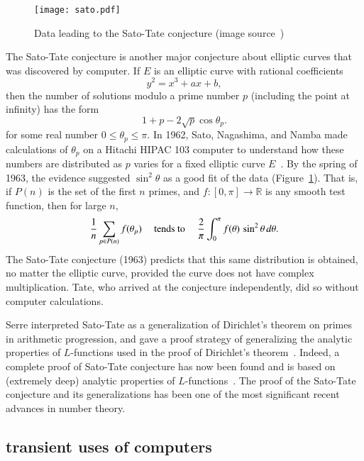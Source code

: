 \documentclass{llncs}
\newcommand{\ring}[1]{\mathbb{#1}}
\begin{document}

\begin{figure}[h!]
  \centering
\texttt{[image: sato.pdf]}
  \caption{Data leading to the Sato-Tate conjecture (image source~\cite{ST2})}
\label{fig:st}
\end{figure}



The Sato-Tate conjecture is another major conjecture about elliptic
curves that was discovered by computer.  If $E$ is an elliptic curve
with rational coefficients
\[
y^2 = x^3 + a x + b,
\]
then the number of solutions modulo a prime number $p$ (including the
point at infinity) has the form
\[
1 + p - 2\sqrt{p}\cos\theta_p.
\]
for some real number $0\le \theta_p\le \pi$.  In 1962, Sato,
Nagashima, and Namba made calculations  of $\theta_p$ on a Hitachi
HIPAC 103 computer to understand how these numbers are distributed as
$p$ varies for a fixed elliptic curve $E$~\cite{Sch}.  By the spring of 1963, the
evidence suggested  $\sin^2\theta$ as a good fit of the data (Figure~\ref{fig:st}).
That is, if $P(n)$ is the set of the first $n$ primes, and
$f:[0,\pi]\to\ring{R}$ is any smooth test function, then for large
$n$,
\[
\frac{1}{n}\sum_{p\in P(n)} f(\theta_p) \quad\hbox{ tends to }\quad
\frac{2}{\pi}\int_0^\pi f(\theta)\,\sin^2\theta\,d\theta.
\]
The Sato-Tate conjecture (1963) predicts that this same distribution is
obtained, no matter the elliptic curve, provided the curve does not
have complex multiplication.  Tate, who arrived at the conjecture
independently, did so without computer calculations.

Serre interpreted Sato-Tate as a generalization of Dirichlet's theorem
on primes in arithmetic progression, and gave a proof strategy of
generalizing the analytic properties of $L$-functions used in the
proof of Dirichlet's theorem~\cite{Se68}.  Indeed, a complete proof of
Sato-Tate conjecture has now been found and is based on (extremely
deep) analytic properties of $L$-functions~\cite{Car:Bourbaki}.  The
proof of the Sato-Tate conjecture and its generalizations has been one
of the most significant recent advances in number theory.







\subsection{transient uses of computers}
\end{document}
